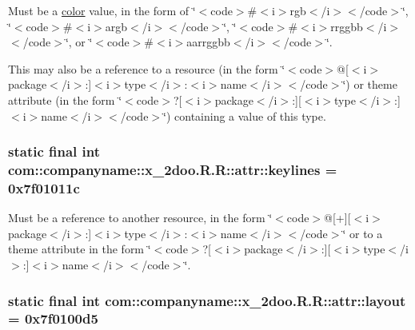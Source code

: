 Must be a \hyperlink{classcom_1_1companyname_1_1x__2doo_1_1_r_1_1color}{color} value, in the form of \char`\"{}$<$code$>$\#$<$i$>$rgb$<$/i$>$$<$/code$>$\char`\"{}, \char`\"{}$<$code$>$\#$<$i$>$argb$<$/i$>$$<$/code$>$\char`\"{}, \char`\"{}$<$code$>$\#$<$i$>$rrggbb$<$/i$>$$<$/code$>$\char`\"{}, or \char`\"{}$<$code$>$\#$<$i$>$aarrggbb$<$/i$>$$<$/code$>$\char`\"{}. 

This may also be a reference to a resource (in the form \char`\"{}$<$code$>$@\mbox{[}$<$i$>$package$<$/i$>$:\mbox{]}$<$i$>$type$<$/i$>$:$<$i$>$name$<$/i$>$$<$/code$>$\char`\"{}) or theme attribute (in the form \char`\"{}$<$code$>$?\mbox{[}$<$i$>$package$<$/i$>$:\mbox{]}\mbox{[}$<$i$>$type$<$/i$>$:\mbox{]}$<$i$>$name$<$/i$>$$<$/code$>$\char`\"{}) containing a value of this type. \hypertarget{classcom_1_1companyname_1_1x__2doo_1_1_r_1_1attr_320e98ff473b48aed0056a901f21a15b}{
\subsubsection[{keylines}]{\setlength{\rightskip}{0pt plus 5cm}static final int com::companyname::x\_\-2doo.R.R::attr::keylines = 0x7f01011c}}
\label{classcom_1_1companyname_1_1x__2doo_1_1_r_1_1attr_320e98ff473b48aed0056a901f21a15b}


Must be a reference to another resource, in the form \char`\"{}$<$code$>$@\mbox{[}+\mbox{]}\mbox{[}$<$i$>$package$<$/i$>$:\mbox{]}$<$i$>$type$<$/i$>$:$<$i$>$name$<$/i$>$$<$/code$>$\char`\"{} or to a theme attribute in the form \char`\"{}$<$code$>$?\mbox{[}$<$i$>$package$<$/i$>$:\mbox{]}\mbox{[}$<$i$>$type$<$/i$>$:\mbox{]}$<$i$>$name$<$/i$>$$<$/code$>$\char`\"{}. \hypertarget{classcom_1_1companyname_1_1x__2doo_1_1_r_1_1attr_ba6f508b84c46daec1c85d2d34a365c9}{
\subsubsection[{layout}]{\setlength{\rightskip}{0pt plus 5cm}static final int com::companyname::x\_\-2doo.R.R::attr::layout = 0x7f0100d5}}
\label{classcom_1_1companyname_1_1x__2doo_1_1_r_1_1attr_ba6f508b84c46daec1c85d2d34a365c9}


